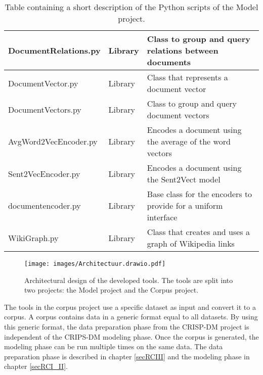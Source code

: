 \begin{table}[!ht]
\begin{tabular}{l|l|p{9.1cm}}
        DocumentRelations.py & Library  & Class to group and query relations between documents \\ \hline
        DocumentVector.py & Library  & Class that represents a document vector \\ \hline
        DocumentVectors.py & Library  & Class to group and query document vectors \\ \hline
        AvgWord2VecEncoder.py & Library  & Encodes a document using the average of the word vectors \\ \hline
        Sent2VecEncoder.py & Library  & Encodes a document using the Sent2Vect model \\ \hline
        documentencoder.py & Library  & Base class for the encoders to provide for a uniform interface \\ \hline
        WikiGraph.py & Library  & Class that creates and uses a graph of Wikipedia links \\ 
    \end{tabular}
    \caption{Table containing a short description of the Python scripts of the Model project.}
	\label{tabModelScripts}
\end{table}
\fi

\begin{figure}[h]
\centering
\captionsetup{justification=centering}

\texttt{[image: images/Architectuur.drawio.pdf]}
\caption{Architectural design of the developed tools. The tools are split into two projects: the Model project and the Corpus project.}
\label{imgtotalarch}
\end{figure}

The tools in the corpus project use a specific dataset as input and convert it to a corpus. A corpus contains data in a generic format equal to all datasets. By using this generic format, the data preparation phase from the CRISP-DM project is independent of the CRIPS-DM modeling phase. Once the corpus is generated, the modeling phase can be run multiple times on the same data. The data preparation phase is described in chapter \ref{secRCIII} and the modeling phase in chapter \ref{secRCI_II}.




\pagebreak